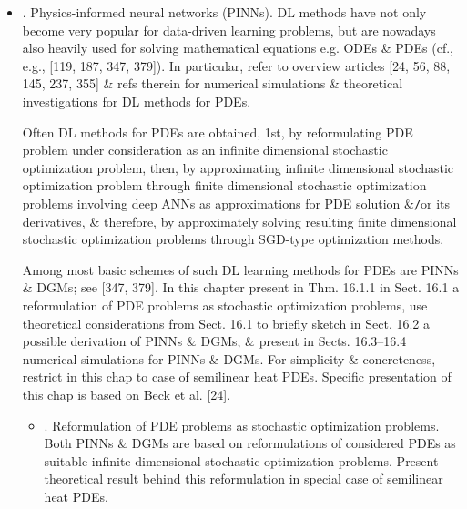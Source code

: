 \documentclass{article}
\begin{document}
\begin{itemize}
	\item {. Physics-informed neural networks (PINNs).} DL methods have not only become very popular for data-driven learning problems, but are nowadays also heavily used for solving mathematical equations e.g. ODEs \& PDEs (cf., e.g., [119, 187, 347, 379]). In particular, refer to overview articles [24, 56, 88, 145, 237, 355] \& refs therein for numerical simulations \& theoretical investigations for DL methods for PDEs.

	Often DL methods for PDEs are obtained, 1st, by reformulating PDE problem under consideration as an infinite dimensional stochastic optimization problem, then, by approximating infinite dimensional stochastic optimization problem through finite dimensional stochastic optimization problems involving deep ANNs as approximations for PDE solution \&{\tt/}or its derivatives, \& therefore, by approximately solving resulting finite dimensional stochastic optimization problems through SGD-type optimization methods.

	Among most basic schemes of such DL learning methods for PDEs are PINNs \& DGMs; see [347, 379]. In this chapter present in Thm. 16.1.1 in Sect. 16.1 a reformulation of PDE problems as stochastic optimization problems, use theoretical considerations from Sect. 16.1 to briefly sketch in Sect. 16.2 a possible derivation of PINNs \& DGMs, \& present in Sects. 16.3--16.4 numerical simulations for PINNs \& DGMs. For simplicity \& concreteness, restrict in this chap to case of semilinear heat PDEs. Specific presentation of this chap is based on Beck et al. [24].
	\begin{itemize}
		\item {. Reformulation of PDE problems as stochastic optimization problems.} Both PINNs \& DGMs are based on reformulations of considered PDEs as suitable infinite dimensional stochastic optimization problems. Present theoretical result behind this reformulation in special case of semilinear heat PDEs.


\end{itemize}
\end{itemize}
\end{document}
